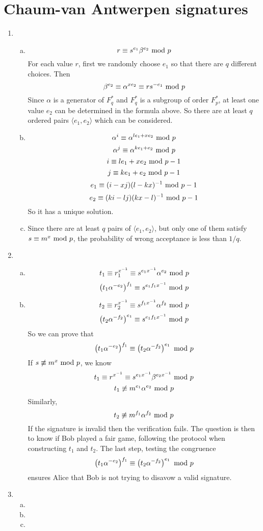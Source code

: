 \documentclass{article}
\renewcommand{\mod}{{\rm\ mod\ }}
\begin{document}
\section{Chaum-van Antwerpen signatures}
\begin{enumerate}
\item
\begin{enumerate}[(a)]
\item
$$r \equiv s^{e_1}\beta^{e_2} \mod p$$
For each value $r$, first we randomly choose $e_1$ so that there are $q$ different choices. Then
$$\beta^{e_2} \equiv \alpha^{xe_2} \equiv rs^{-e_1} \mod p$$
Since $\alpha$ is a generator of $F_q^*$ and $F_q^*$ is a subgroup of order $F_p^*$, at least one value $e_2$ can be determined in the formula above. So there are at least $q$ ordered pairs $\langle e_1,e_2 \rangle$ which can be considered.
\item
$$\alpha^i \equiv \alpha^{le_1+xe_2} \mod p$$
$$\alpha^j \equiv \alpha^{ke_1+e_2} \mod p$$
$$i \equiv le_1+xe_2 \mod p-1$$
$$j \equiv ke_1+e_2 \mod p-1$$
$$e_1 \equiv (i-xj)(l-kx)^{-1} \mod p-1$$
$$e_2 \equiv (ki-lj)(kx-l)^{-1} \mod p-1$$
So it has a unique solution.
\item
Since there are at least $q$ pairs of $\langle e_1,e_2 \rangle$, but only one of them satisfy $s\equiv m^x\mod p$, the probability of wrong acceptance is less than $1/q$.
\end{enumerate}

\item
\begin{enumerate}[(a)]
\item
$$t_1 \equiv r_1^{x^{-1}} \equiv s^{e_1x^{-1}}\alpha^{e_2} \mod p$$
$$\left(t_1\alpha^{-e_2}\right)^{f_1} \equiv s^{e_1f_1x^{-1}} \mod p$$
\item
$$t_2 \equiv r_2^{x^{-1}} \equiv s^{f_1x^{-1}}\alpha^{f_2} \mod p$$
$$\left(t_2\alpha^{-f_2}\right)^{e_1} \equiv s^{e_1f_1x^{-1}} \mod p$$
So we can prove that $$\left(t_1\alpha^{-e_2}\right)^{f_1} \equiv \left(t_2\alpha^{-f_2}\right)^{e_1} \mod p$$
If $s\not\equiv m^x \mod p$, we know
$$t_1\equiv r^{x^{-1}} \equiv s^{e_1x^{-1}}\beta^{e_2x^{-1}} \mod p$$
$$t_1\not\equiv m^{e_1}\alpha^{e_2} \mod p$$
Similarly,
$$t_2\not\equiv m^{f_1}\alpha^{f_2} \mod p$$
If the signature is invalid then the verification fails. The question is then to know if Bob played a fair game, following the protocol when constructing $t_1$ and $t_2$.
The last step, testing the congruence
$$\left(t_1\alpha^{-e_2}\right)^{f_1} \equiv \left(t_2\alpha^{-f_2}\right)^{e_1} \mod p$$
ensures Alice that Bob is not trying to disavow a valid signature.
\end{enumerate}

\item
\begin{enumerate}[(a)]
\item

\item
\item
\end{enumerate}

\end{enumerate}
\end{document}
